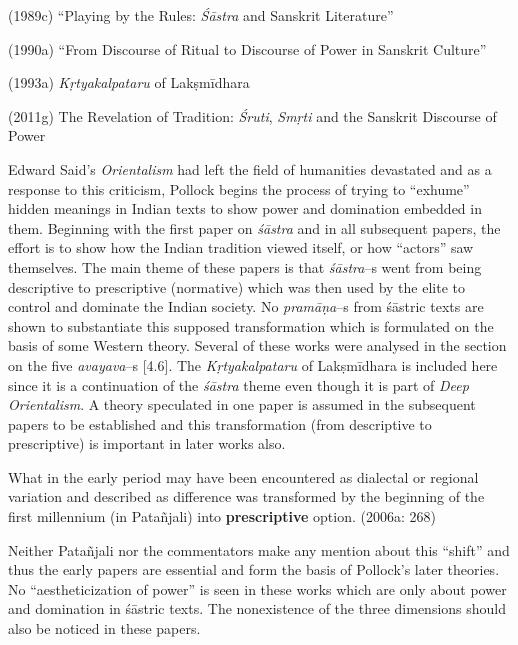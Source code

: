  \item (1989c) “Playing by the Rules: \textit{Śāstra} and Sanskrit Literature”

 \item (1990a) “From Discourse of Ritual to Discourse of Power in Sanskrit Culture”

 \item (1993a) \textit{Kṛtyakalpataru} of Lakṣmīdhara

 \item (2011g) The Revelation of Tradition: \textit{Śruti}, \textit{Smṛti} and the Sanskrit Discourse of Power

Edward Said’s \textit{Orientalism} had left the field of humanities devastated and as a response to this criticism, Pollock begins the process of trying to “exhume” hidden meanings in Indian texts to show power and domination embedded in them. Beginning with the first paper on \textit{śāstra} and in all subsequent papers, the effort is to show how the Indian tradition viewed itself, or how “actors” saw themselves. The main theme of these papers is that \textit{śāstra}–s went from being descriptive to prescriptive (normative) which was then used by the elite to control and dominate the Indian society. No \textit{pramāṇa}–s from śāstric texts are shown to substantiate this supposed transformation which is formulated on the basis of some Western theory. Several of these works were analysed in the section on the five \textit{avayava}–s [4.6]. The \textit{Kṛtyakalpataru} of Lakṣmīdhara is included here since it is a continuation of the \textit{śāstra} theme even though it is part of \textit{Deep Orientalism}. A theory speculated in one paper is assumed in the subsequent papers to be established and this transformation (from descriptive to prescriptive) is important in later works also.

\begin{myquote}
What in the early period may have been encountered as dialectal or regional variation and described as difference was transformed by the beginning of the ﬁrst millennium (in Patañjali) into \textbf{prescriptive} option. (2006a: 268)
\end{myquote}

Neither Patañjali nor the commentators make any mention about this “shift” and thus the early papers are essential and form the basis of Pollock’s later theories. No “aestheticization of power” is seen in these works which are only about power and domination in śāstric texts. The nonexistence of the three dimensions should also be noticed in these papers.



